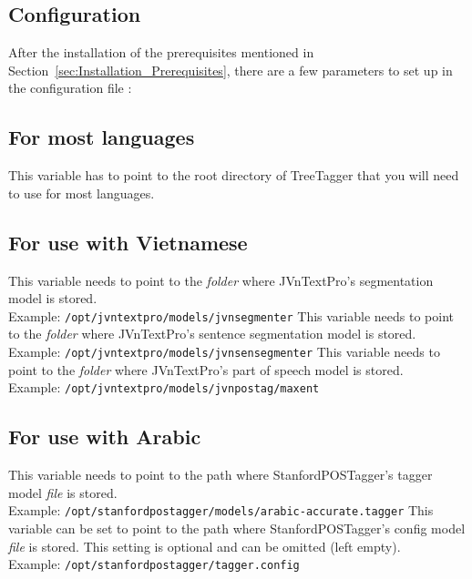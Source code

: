\subsection{Configuration}\label{sec:Installation_Configuration}
After the installation of the prerequisites mentioned in Section~\ref{sec:Installation_Prerequisites}, there are a few parameters to set up in the configuration file \configFile{}:
\begin{itemize}

\subsection*{\textbf{For most languages}}
This variable has to point to the root directory of TreeTagger that you will need to use for most languages.

\subsection*{\textbf{For use with Vietnamese}}
This variable needs to point to the \textit{folder} where JVnTextPro's segmentation model is stored. \\
Example: \texttt{/opt/jvntextpro/models/jvnsegmenter}
This variable needs to point to the \textit{folder} where JVnTextPro's sentence segmentation model is stored. \\
Example: \texttt{/opt/jvntextpro/models/jvnsensegmenter}
This variable needs to point to the \textit{folder} where JVnTextPro's part of speech model is stored. \\
Example: \texttt{/opt/jvntextpro/models/jvnpostag/maxent}

\subsection*{\textbf{For use with Arabic}}
This variable needs to point to the path where StanfordPOSTagger's tagger model \textit{file} is stored. \\
Example: \texttt{/opt/stanfordpostagger/models/arabic-accurate.tagger}
This variable can be set to point to the path where StanfordPOSTagger's config model \textit{file} is stored. This setting is optional and can be omitted (left empty). \\
Example: \texttt{/opt/stanfordpostagger/tagger.config}


\end{itemize}

